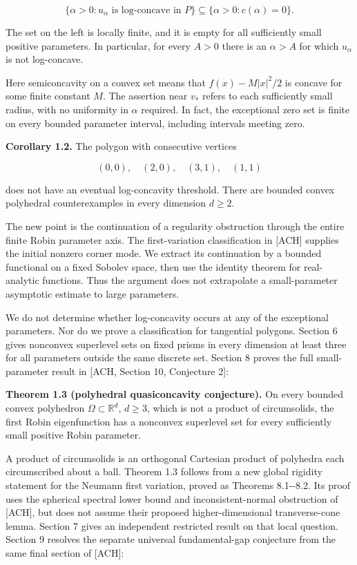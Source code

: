 \documentclass[11pt]{article}
\begin{document}
\[
\{\alpha>0:u_\alpha\text{ is log-concave in }P\}
\subseteq\{\alpha>0:c(\alpha)=0\}.
\tag{1.4}
\]

The set on the left is locally finite, and it is empty for all
sufficiently small positive parameters. In particular, for every \(A>0\)
there is an \(\alpha>A\) for which \(u_\alpha\) is not log-concave.

Here semiconcavity on a convex set means that \(f(x)-M|x|^2/2\) is
concave for some finite constant \(M\). The assertion near \(v_*\)
refers to each sufficiently small radius, with no uniformity in
\(\alpha\) required. In fact, the exceptional zero set is finite on
every bounded parameter interval, including intervals meeting zero.

\textbf{Corollary 1.2.} The polygon with consecutive vertices

\[
(0,0),\quad(2,0),\quad(3,1),\quad(1,1)
\tag{1.5}
\]

does not have an eventual log-concavity threshold. There are bounded
convex polyhedral counterexamples in every dimension \(d\ge2\).

The new point is the continuation of a regularity obstruction through
the entire finite Robin parameter axis. The first-variation
classification in {[}ACH{]} supplies the initial nonzero corner mode. We
extract its continuation by a bounded functional on a fixed Sobolev
space, then use the identity theorem for real-analytic functions. Thus
the argument does not extrapolate a small-parameter asymptotic estimate
to large parameters.

We do not determine whether log-concavity occurs at any of the
exceptional parameters. Nor do we prove a classification for tangential
polygons. Section 6 gives nonconvex superlevel sets on fixed prisms in
every dimension at least three for all parameters outside the same
discrete set. Section 8 proves the full small-parameter result in
{[}ACH, Section 10, Conjecture 2{]}:

\textbf{Theorem 1.3 (polyhedral quasiconcavity conjecture).} On every
bounded convex polyhedron \(\Omega\subset\mathbb R^d\), \(d\ge3\), which
is not a product of circumsolids, the first Robin eigenfunction has a
nonconvex superlevel set for every sufficiently small positive Robin
parameter.

A product of circumsolids is an orthogonal Cartesian product of
polyhedra each circumscribed about a ball. Theorem 1.3 follows from a
new global rigidity statement for the Neumann first variation, proved as
Theorems 8.1-\/-8.2. Its proof uses the spherical spectral lower bound
and inconsistent-normal obstruction of {[}ACH{]}, but does not assume
their proposed higher-dimensional transverse-cone lemma. Section 7 gives
an independent restricted result on that local question. Section 9
resolves the separate universal fundamental-gap conjecture from the same
final section of {[}ACH{]}:
\end{document}
